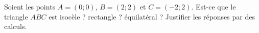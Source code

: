 
\begin{exercice}\label{exoSeconde-0006}

    Soient les points \( A=(0;0)\), \( B=(2;2)\) et \( C=(-2;2)\). Est-ce que le triangle \( ABC\) est isocèle ? rectangle ? équilatéral ? Justifier les réponses par des calculs.

\end{exercice}
